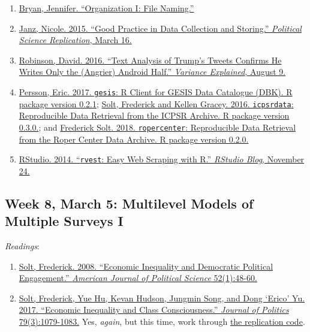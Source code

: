 \documentclass[]{article}
\providecommand{\tightlist}{%
  \setlength{\itemsep}{0pt}\setlength{\parskip}{0pt}}
\begin{document}
\begin{enumerate}
\def\labelenumi{\arabic{enumi}.}
\tightlist
\item
  \href{https://rawgit.com/Reproducible-Science-Curriculum/rr-organization1/master/organization-01-slides.html}{Bryan,
  Jennifer. ``Organization I: File Naming.''}
\item
  \href{https://politicalsciencereplication.wordpress.com/2015/03/16/good-practice-in-data-collection-and-storing/}{Janz,
  Nicole. 2015. ``Good Practice in Data Collection and Storing.''
  \emph{Political Science Replication}, March 16.}
\item
  \href{http://varianceexplained.org/r/trump-tweets/}{Robinson, David.
  2016. ``Text Analysis of Trump's Tweets Confirms He Writes Only the
  (Angrier) Android Half.'' \emph{Variance Explained}, August 9.}
\item
  \href{https://cran.r-project.org/web/packages/gesis/vignettes/gesis.html}{Persson,
  Eric. 2017. \texttt{gesis}: R Client for GESIS Data Catalogue (DBK). R
  package version 0.2.1};
  \href{https://cran.r-project.org/web/packages/icpsrdata/vignettes/icpsrdata-vignette.html}{Solt,
  Frederick and Kellen Gracey. 2016. \texttt{icpsrdata}: Reproducible
  Data Retrieval from the ICPSR Archive. R package version 0.3.0.}; and
  \href{https://cran.r-project.org/web/packages/ropercenter/vignettes/ropercenter-vignette.html}{Frederick
  Solt. 2018. \texttt{ropercenter}: Reproducible Data Retrieval from the
  Roper Center Data Archive. R package version 0.2.0.}
\item
  \href{https://blog.rstudio.org/2014/11/24/rvest-easy-web-scraping-with-r/}{RStudio.
  2014. ``\texttt{rvest}: Easy Web Scraping with R.'' \emph{RStudio
  Blog}, November 24.}
\end{enumerate}

\hypertarget{week-8-march-5-multilevel-models-of-multiple-surveys-i}{%
\subsection{Week 8, March 5: Multilevel Models of Multiple Surveys
I}\label{week-8-march-5-multilevel-models-of-multiple-surveys-i}}

\emph{Readings}:

\begin{enumerate}
\def\labelenumi{\arabic{enumi}.}
\tightlist
\item
  \href{http://www.jstor.org.proxy.lib.uiowa.edu/stable/25193796}{Solt,
  Frederick. 2008. ``Economic Inequality and Democratic Political
  Engagement.'' \emph{American Journal of Political Science}
  52(1):48-60.}
\item
  \href{https://www-journals-uchicago-edu.proxy.lib.uiowa.edu/doi/pdfplus/10.1086/690971}{Solt,
  Frederick, Yue Hu, Kevan Hudson, Jungmin Song, and Dong `Erico' Yu.
  2017. ``Economic Inequality and Class Consciousness.'' \emph{Journal
  of Politics} 79(3):1079-1083.} Yes, \emph{again}, but this time, work
  through
  \href{https://github.com/fsolt/class_consciousness/blob/master/paper/class_consciousness.Rnw}{the
  replication code}.
\end{enumerate}
\end{document}
